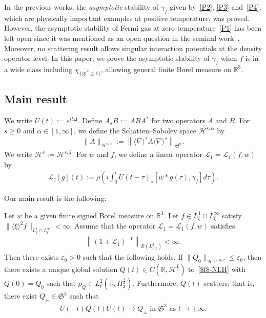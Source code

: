 \documentclass[AHL,Unicode,longabstracts,MathTools,published]{cedram}
\newcommand{\BR}{\mathbb{R}}
\newcommand{\CB}{\mathcal{B}}
\newcommand{\CH}{\mathcal{H}}
\newcommand{\CL}{\mathcal{L}}
\newcommand{\FS}{\mathfrak{S}}
\newcommand{\al}{\alpha}
\newcommand{\ga}{\gamma}
\newcommand{\ep}{\varepsilon}
\newcommand{\ta}{\tau}
\newcommand{\rh}{\rho}
\newcommand{\ch}{\chi}
\newcommand{\De}{\Delta}
\newcommand{\K}[1]{\left(#1\right)}
\newcommand{\I}{\infty}
\newcommand{\sd}{\langle \nabla \rangle}
\newcommand{\lxr}{\langle \xi \rangle}
\newcommand{\Sa}{{\FS^\al}}
\newcommand{\st}{\star}
\newcommand{\tw}{\frac{1}{2}}
\begin{document}
In the previous works, the \emph{asymptotic} stability of $\ga_f$ given by~\eqref{P2}, \eqref{P3} and~\eqref{P4}, which are physically important examples at positive temperature, was proved. However, the asymptotic stability of Fermi gas at zero temperature~\eqref{P1} has been left open since it was mentioned as an open question in the seminal work~\cite{2014LS}. Moreover, no scattering result allows singular interaction potentials at the density operator level. In this paper, we prove the asymptotic stability of $\ga_f$ when $f$ is in a wide class including $\ch_{\{|\xi|^2\le 1\}}$, allowing general finite Borel measure on $\BR^3$.

\subsection{Main result}

We write $U(t):=e^{it\De}$. Define $A_\st B := A B A^*$ for two operators $A$ and $B$. For $s \ge 0$ and $\al \in [1,\I]$, we define the Schatten--Sobolev space $\CH^{s,\al}$ by
\begin{align}
\|A\|_{\CH^{s,\al}} := \left\|\sd^s A \sd^s\right\|_\Sa.
\end{align}
We write $\CH^{s}:= \CH^{s,2}$. For $w$ and $f$, we define a linear operator $\CL_1 = \CL_1(f,w)$ by
\begin{align}
\CL_1[g](t) := \rh \K{i\int_0^t U(t-\ta)_\st [w \ast g(\ta), \ga_f] d\ta}.
\end{align}

Our main result is the following:

\begin{theo} \label{main}
Let $w$ be a given finite signed Borel measure on $\BR^3$. Let $f \in L^1_\xi \cap L^\I_\xi$ satisfy $\|\lxr^2 f\|_{L^1_\xi \cap L^\I_\xi} < \I$. Assume that the operator $\CL_1 = \CL_1(f,w)$ satisfies
\begin{align}
\left\|(1+\CL_1)^{-1}\right\|_{\CB(L^2_{t,x})} < \I.
\end{align}
Then there exists $\ep_0 > 0$ such that the following holds. If $\| Q_0 \|_{\CH^{1/2,3/2}} \leq \ep_0$, then there exists a unique global solution $Q(t) \in C(\BR, \CH^\tw)$ to~\eqref{$f$-NLH} with $Q(0)=Q_0$ such that $\rh_Q \in L^2_t(\BR, H^\tw_x)$. Furthermore, $Q(t)$ scatters; that is, there exist $Q_{\pm} \in \FS^3$ such that
\begin{align}
U(-t)Q(t)U(t) \to Q_\pm \text{ in } \FS^3 \text{ as } t \to \pm \I.
\end{align}
\end{theo}
\end{document}
